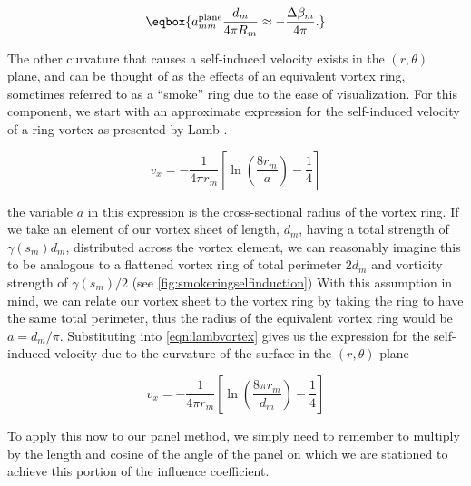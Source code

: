 \begin{equation}
	\label{eqn:aplanemm}
	\eqbox{
	a^\text{plane}_{mm}\frac{d_m}{4 \pi R_m} \approx -\frac{\Delta \beta_m}{4 \pi}.
}
\end{equation}







The other curvature that causes a self-induced velocity exists in the \((r,\theta)\) plane, and can be thought of as the effects of an equivalent vortex ring, sometimes referred to as a ``smoke'' ring due to the ease of visualization.
For this component, we start with an approximate expression for the self-induced velocity of a ring vortex as presented by Lamb \cite{Lamb_1945}.%

\begin{equation}
	\label{eqn:lambvortex}
	v_x = - \frac{1}{4 \pi r_m} \left[ \ln \left(\frac{8 r_m}{a}\right) - \frac{1}{4}\right]
\end{equation}

\where %
the variable \(a\) in this expression is the cross-sectional radius of the vortex ring.
If we take an element of our vortex sheet of length, \(d_m\), having a total strength of \(\gamma(s_m)d_m\), distributed across the vortex element, we can reasonably imagine this to be analogous to a flattened vortex ring of total perimeter \(2d_m\) and vorticity strength of \(\gamma(s_m)/2\) (see \cref{fig:smokeringselfinduction})
With this assumption in mind, we can relate our vortex sheet to the vortex ring by taking the ring to have the same total perimeter, thus the radius of the equivalent vortex ring would be \(a = d_m / \pi\).
Substituting into \cref{eqn:lambvortex} gives us the expression for the self-induced velocity due to the curvature of the surface in the \((r,\theta)\) plane

\begin{equation}
	v_x = - \frac{1}{4 \pi r_m} \left[ \ln \left(\frac{8 \pi r_m}{d_m}\right) - \frac{1}{4}\right]
\end{equation}

\noindent To apply this now to our panel method, we simply need to remember to multiply by the length and cosine of the angle of the panel on which we are stationed to achieve this portion of the influence coefficient.

